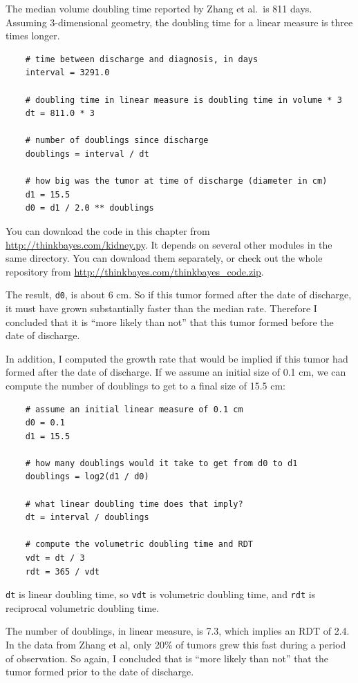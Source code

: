 \documentclass[12pt]{book}
\begin{document}
The median volume doubling time reported by Zhang et al.~is 811 days.
Assuming 3-dimensional geometry, the doubling time for a linear
measure is three times longer.

\begin{verbatim}
    # time between discharge and diagnosis, in days 
    interval = 3291.0

    # doubling time in linear measure is doubling time in volume * 3
    dt = 811.0 * 3

    # number of doublings since discharge
    doublings = interval / dt

    # how big was the tumor at time of discharge (diameter in cm)
    d1 = 15.5
    d0 = d1 / 2.0 ** doublings
\end{verbatim}

You can download the code in this chapter from
\url{http://thinkbayes.com/kidney.py}.  It depends on several other
modules in the same directory.  You can download them separately, or
check out the whole repository from
\url{http://thinkbayes.com/thinkbayes_code.zip}.

The result, {\tt d0}, is about 6 cm.  So if this tumor formed after
the date of discharge, it must have grown substantially faster than
the median rate.  Therefore I concluded that it is ``more likely than
not'' that this tumor formed before the date of discharge.

In addition, I computed the growth rate that would be implied
if this tumor had formed after the date of discharge.  If we
assume an initial size of 0.1 cm, we can compute the number of
doublings to get to a final size of 15.5 cm:

\begin{verbatim}
    # assume an initial linear measure of 0.1 cm
    d0 = 0.1
    d1 = 15.5

    # how many doublings would it take to get from d0 to d1
    doublings = log2(d1 / d0)

    # what linear doubling time does that imply?
    dt = interval / doublings

    # compute the volumetric doubling time and RDT
    vdt = dt / 3
    rdt = 365 / vdt
\end{verbatim}

{\tt dt} is linear doubling time, so {\tt vdt} is volumetric
doubling time, and {\tt rdt} is reciprocal volumetric doubling
time.

The number of doublings, in linear measure, is 7.3, which implies
an RDT of 2.4.  In the data from Zhang et al, only 20\% of tumors
grew this fast during a period of observation.  So again,
I concluded that is ``more likely than not'' that the tumor
formed prior to the date of discharge.
\end{document}
